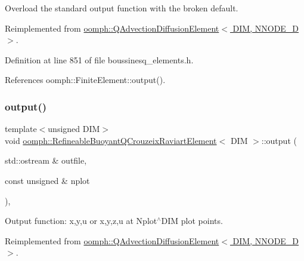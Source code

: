 Overload the standard output function with the broken default. 



Reimplemented from \hyperlink{classoomph_1_1QAdvectionDiffusionElement_af30152cc8ea671b103239fc6b3e506ce}{oomph\+::\+Q\+Advection\+Diffusion\+Element$<$ D\+I\+M, N\+N\+O\+D\+E\+\_\+D $>$}.



Definition at line 851 of file boussinesq\+\_\+elements.\+h.



References oomph\+::\+Finite\+Element\+::output().

\mbox{\label{classoomph_1_1RefineableBuoyantQCrouzeixRaviartElement_a36bc6dc9052947f0932a605dd4d0e8f0}} 
\subsubsection{\texorpdfstring{output()}{output()}\hspace{0.1cm}{\footnotesize\ttfamily [2/4]}}
{\footnotesize\ttfamily template$<$unsigned D\+IM$>$ \\
void \hyperlink{classoomph_1_1RefineableBuoyantQCrouzeixRaviartElement}{oomph\+::\+Refineable\+Buoyant\+Q\+Crouzeix\+Raviart\+Element}$<$ D\+IM $>$\+::output (\begin{DoxyParamCaption}\item[{std\+::ostream \&}]{outfile,  }\item[{const unsigned \&}]{nplot }\end{DoxyParamCaption})\hspace{0.3cm}{\ttfamily [inline]}, {\ttfamily [virtual]}}



Output function\+: x,y,u or x,y,z,u at Nplot$^\wedge$\+D\+IM plot points. 



Reimplemented from \hyperlink{classoomph_1_1QAdvectionDiffusionElement_a248d31c455b267075d437ae2833540c6}{oomph\+::\+Q\+Advection\+Diffusion\+Element$<$ D\+I\+M, N\+N\+O\+D\+E\+\_\+D $>$}.



